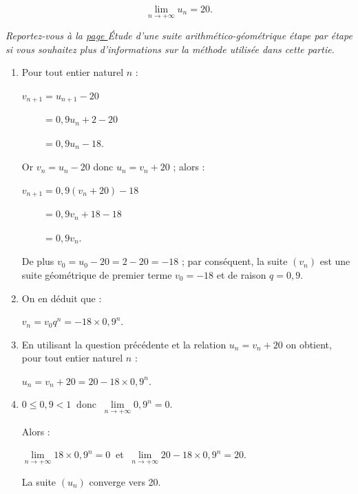 \begin{corrige}
\begin{enumerate}
          \[ \lim_{n \rightarrow +\infty} u_n =20. \]
          \par
     \end{enumerate}
     \par
     \par
     \textit{Reportez-vous à la \hyperlink{suite-ag-pap}{page \pageref*{suite-ag-pap}}  \og \'Etude d'une suite arithmético-géométrique étape par étape  \fg{} si vous souhaitez plus d'informations sur la méthode utilisée dans cette partie.
     }
     \par
     \begin{enumerate}
          \item %
          Pour tout entier naturel $n$ :
          \par
          $v_{n+1}=u_{n+1}-20$
          \par
          $\phantom{v_{n+1}}=0,9u_n+2-20$
          \par
          $\phantom{v_{n+1}}=0,9u_n-18$.
          \par
          Or $v_n=u_n-20$ donc $u_n=v_n+20$ ; alors :
          \par
          $v_{n+1}=0,9(v_n+20)-18$
          \par
          $\phantom{v_{n+1}}=0,9v_n+18-18$
          \par
          $\phantom{v_{n+1}}=0,9v_n$.
          \par
          De plus ${v_0=u_0-20=2-20=-18}$ ; par conséquent, la suite $(v_n)$ est une suite géométrique de premier terme ${v_0=-18}$ et de raison ${q=0,9}$.
          \item %
          On en déduit que :
          \par
          $v_n=v_0q^n=-18 \times 0,9^n$.
          \item %
          En utilisant la question précédente et la relation $u_n=v_n+20$ on obtient, pour tout entier naturel $n$ :
          \par
          $u_n=v_n+20=20-18 \times 0,9^n$.
          \item %
          ${0 \leqslant 0,9 < 1}\ $ donc $\ \lim\limits_{n \rightarrow +\infty } 0,9^n = 0$.
          \par
          Alors :
          \par
          $\lim\limits_{n \rightarrow +\infty}18 \times 0,9^n = 0\ $ et $\ \lim\limits_{n \rightarrow +\infty}20-18 \times 0,9^n = 20$.
          \par
          La suite $(u_n)$ converge vers 20.

\end{enumerate}
\end{corrige}
